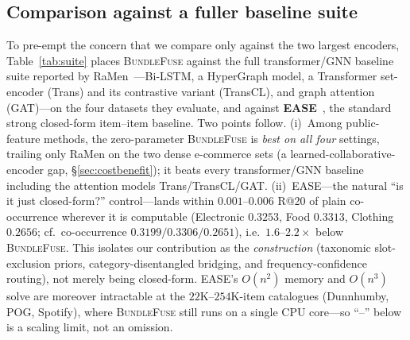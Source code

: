 \subsection{Comparison against a fuller baseline suite}
\label{sec:suite}
To pre-empt the concern that we compare only against the two largest encoders, Table~\ref{tab:suite} places
\textsc{BundleFuse} against the full transformer/GNN baseline suite reported by RaMen~\cite{ramen}---Bi-LSTM, a
HyperGraph model, a Transformer set-encoder (Trans) and its contrastive variant (TransCL), and graph attention
(GAT)---on the four datasets they evaluate, and against \textbf{EASE}~\cite{steck2019}, the standard strong
closed-form item--item baseline. Two points follow. (i)~Among public-feature methods, the zero-parameter
\textsc{BundleFuse} is \emph{best on all four} settings, trailing only RaMen on the two dense e-commerce sets
(a learned-collaborative-encoder gap, \S\ref{sec:costbenefit}); it beats every transformer/GNN baseline including the
attention models Trans/TransCL/GAT. (ii)~EASE---the natural ``is it
just closed-form?'' control---lands within $0.001$--$0.006$ R@20 of plain co-occurrence wherever it is computable
(Electronic $0.3253$, Food $0.3313$, Clothing $0.2656$; cf.\ co-occurrence $0.3199/0.3306/0.2651$), i.e.\
$1.6$--$2.2\times$ below \textsc{BundleFuse}. This isolates our contribution as the \emph{construction} (taxonomic
slot-exclusion priors, category-disentangled bridging, and frequency-confidence routing), not merely being
closed-form. EASE's $O(n^2)$ memory and $O(n^3)$ solve are moreover intractable at the $22$K--$254$K-item catalogues
(Dunnhumby, POG, Spotify), where \textsc{BundleFuse} still runs on a single CPU core---so ``--'' below is a scaling
limit, not an omission.

